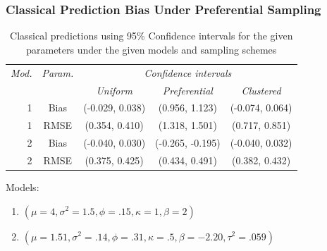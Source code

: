 \documentclass[xcolor=svgnames]{beamer}
\begin{document}
\begin{frame}
\frametitle{Classical Prediction Bias Under Preferential Sampling}
\begin{table}[ht]
\centering
\begin{tabular}{|r|cccc|}
\hline
\emph{Mod.} &  \emph{Param.} &  \multicolumn{3}{c|}{\emph{Confidence intervals}}  \\ \cline{3-5}
& & \emph{Uniform} & \emph{Preferential} & \emph{Clustered} \\
\hline
1 & Bias & (-0.029,  0.038) & (0.956, 1.123) & (-0.074, 0.064) \\ 
1 & RMSE & (0.354, 0.410) & (1.318, 1.501) & (0.717, 0.851) \\ 
2 & Bias & (-0.040,  0.030) & (-0.265, -0.195) & (-0.040, 0.032) \\
2 & RMSE & (0.375, 0.425) & (0.434, 0.491)& (0.382, 0.432) \\
\hline
\end{tabular}
\caption{Classical predictions using 95\% Confidence intervals for the given parameters under the given models and sampling schemes}
\end{table}
Models:
\begin{enumerate}
\item $(\mu=4, \sigma^2=1.5, \phi=.15, \kappa=1, \beta=2)$
\item $(\mu=1.51, \sigma^2=.14, \phi=.31, \kappa=.5, \beta=-2.20, \tau^2=.059)$
\end{enumerate}

\end{frame}
\end{document}
